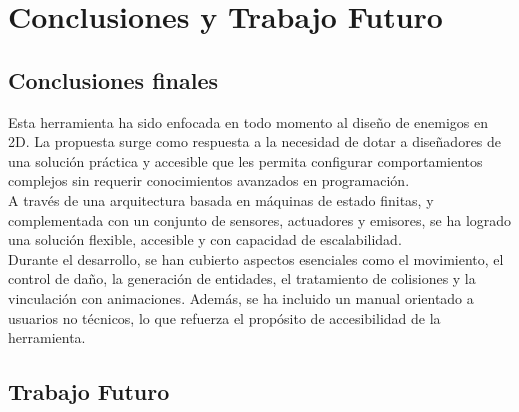 \chapter{Conclusiones y Trabajo Futuro}
\label{cap:conclusiones}

\section*{Conclusiones finales}
Esta herramienta ha sido enfocada en todo momento al diseño de enemigos en 2D.  La propuesta surge como respuesta a la necesidad de dotar a diseñadores de una solución práctica y accesible que les permita configurar comportamientos complejos sin requerir conocimientos avanzados en programación.\\
A través de una arquitectura basada en máquinas de estado finitas, y complementada con un conjunto de sensores, actuadores y emisores, se ha logrado una solución flexible, accesible y con capacidad de escalabilidad.\\
Durante el desarrollo, se han cubierto aspectos esenciales como el movimiento, el control de daño, la generación de entidades, el tratamiento de colisiones y la vinculación con animaciones. Además, se ha incluido un manual orientado a usuarios no técnicos, lo que refuerza el propósito de accesibilidad de la herramienta.


\section*{Trabajo Futuro}

